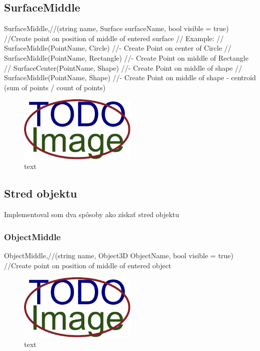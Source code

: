 \subsection{SurfaceMiddle}
		SurfaceMiddle,//(string name, Surface surfaceName, bool visible = true) //Create point on position of middle of entered surface
		//	Example:
		//		SurfaceMiddle(PointName, Circle)	//- Create Point on center of Circle
		//		SurfaceMiddle(PointName, Rectangle)	//- Create Point on middle of Rectangle
		//		SurfaceCenter(PointName, Shape)		//- Create Point on middle of shape 
		//		SurfaceMiddle(PointName, Shape)		//- Create Point on middle of shape - centroid (sum of points / count of points)
\begin{figure}[H]
	\centering
	\includegraphics[width=0.5\textwidth]{obrazky-figures/placeholder.pdf}
	\caption{text}
	\label{fig:1}
\end{figure}

\subsection{Stred objektu}
Implementoval som dva spôsoby ako získať stred objektu
\subsubsection{ObjectMiddle}

		ObjectMiddle,//(string name, Object3D ObjectName, bool visible = true) //Create point on position of middle of entered object
		
\begin{figure}[H]
	\centering
	\includegraphics[width=0.5\textwidth]{obrazky-figures/placeholder.pdf}
	\caption{text}
	\label{fig:1}
\end{figure}

